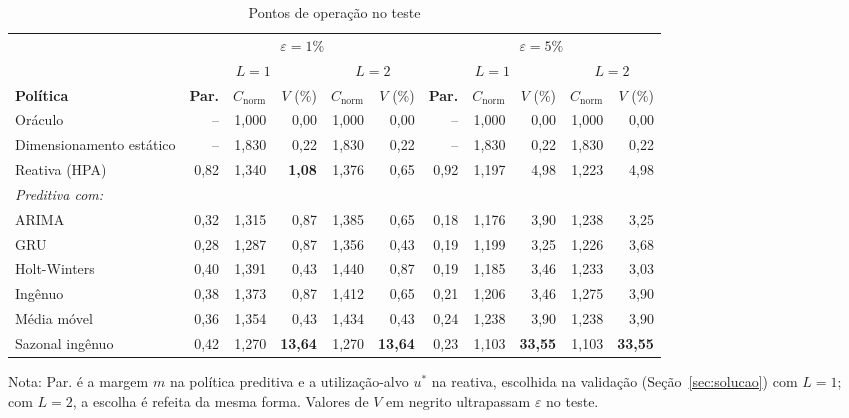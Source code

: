 \begin{table}[htbp]
\centering
\caption{Pontos de operação no teste}
\label{tab:pontos-operacao}
\footnotesize
\setlength{\tabcolsep}{3pt}
\begin{tabular}{l rrr rr @{\hspace{6pt}} rrr rr}
\toprule
 & \multicolumn{5}{c}{$\varepsilon = 1\%$} & \multicolumn{5}{c}{$\varepsilon = 5\%$} \\
\cmidrule(lr){2-6} \cmidrule(lr){7-11}
 & \multicolumn{3}{c}{$L = 1$} & \multicolumn{2}{c}{$L = 2$} & \multicolumn{3}{c}{$L = 1$} & \multicolumn{2}{c}{$L = 2$} \\
\cmidrule(lr){2-4} \cmidrule(lr){5-6} \cmidrule(lr){7-9} \cmidrule(lr){10-11}
\textbf{Política} & \textbf{Par.} & $C_{\mathrm{norm}}$ & $V$ (\%) & $C_{\mathrm{norm}}$ & $V$ (\%) & \textbf{Par.} & $C_{\mathrm{norm}}$ & $V$ (\%) & $C_{\mathrm{norm}}$ & $V$ (\%) \\
\midrule
Oráculo & -- & 1,000 & 0,00 & 1,000 & 0,00 & -- & 1,000 & 0,00 & 1,000 & 0,00 \\
Dimensionamento estático & -- & 1,830 & 0,22 & 1,830 & 0,22 & -- & 1,830 & 0,22 & 1,830 & 0,22 \\
Reativa (HPA) & 0,82 & 1,340 & \textbf{1,08} & 1,376 & 0,65 & 0,92 & 1,197 & 4,98 & 1,223 & 4,98 \\
\textit{Preditiva com:} & & & & & & & & & & \\
\quad ARIMA & 0,32 & 1,315 & 0,87 & 1,385 & 0,65 & 0,18 & 1,176 & 3,90 & 1,238 & 3,25 \\
\quad GRU & 0,28 & 1,287 & 0,87 & 1,356 & 0,43 & 0,19 & 1,199 & 3,25 & 1,226 & 3,68 \\
\quad Holt-Winters & 0,40 & 1,391 & 0,43 & 1,440 & 0,87 & 0,19 & 1,185 & 3,46 & 1,233 & 3,03 \\
\quad Ingênuo & 0,38 & 1,373 & 0,87 & 1,412 & 0,65 & 0,21 & 1,206 & 3,46 & 1,275 & 3,90 \\
\quad Média móvel & 0,36 & 1,354 & 0,43 & 1,434 & 0,43 & 0,24 & 1,238 & 3,90 & 1,238 & 3,90 \\
\quad Sazonal ingênuo & 0,42 & 1,270 & \textbf{13,64} & 1,270 & \textbf{13,64} & 0,23 & 1,103 & \textbf{33,55} & 1,103 & \textbf{33,55} \\
\bottomrule
\end{tabular}

\smallskip
\parbox{\textwidth}{\footnotesize Nota: Par. é a margem $m$ na política preditiva e a utilização-alvo $u^{*}$ na reativa, escolhida na validação (Seção~\ref{sec:solucao}) com $L = 1$; com $L = 2$, a escolha é refeita da mesma forma. Valores de $V$ em negrito ultrapassam $\varepsilon$ no teste.}
\end{table}

